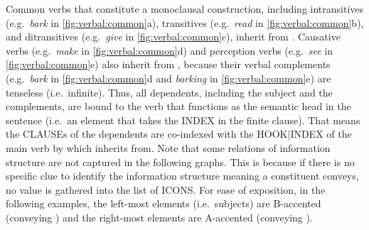 Common verbs that constitute a monoclausal construction, including
intransitives (e.g.\ \textit{bark} in \ref{fig:verbal:common}a),
transitives (e.g.\ \textit{read} in \ref{fig:verbal:common}b), and
ditransitives (e.g.\ \textit{give} in \ref{fig:verbal:common}c),
inherit from . Causative verbs
(e.g.\ \textit{make} in \ref{fig:verbal:common}d) and perception verbs
(e.g.\ \textit{see} in \ref{fig:verbal:common}e) also inherit from
, because their verbal complements
(e.g.\ \textit{bark} in \ref{fig:verbal:common}d and \textit{barking}
in \ref{fig:verbal:common}e) are tenseless (i.e.\ infinite).  Thus,
all dependents, including the subject and the complements, are bound
to the verb that functions as the semantic head in the sentence
(i.e.\ an element that takes the INDEX in the finite
clause). That means the CLAUSEs of the dependents are
co-indexed with the HOOK{$\mid$}INDEX of the main verb by
  which
 inherits from.  Note that some relations
of information structure are not captured in the following
graphs. This is because if there is no specific clue to identify the
information structure meaning a constituent conveys, no value is
gathered into the list of ICONS. For ease of exposition, in the
following examples, the left-most elements (i.e.\ subjects) are
B-accented (conveying ) and the right-most
elements are A-accented (conveying
).


